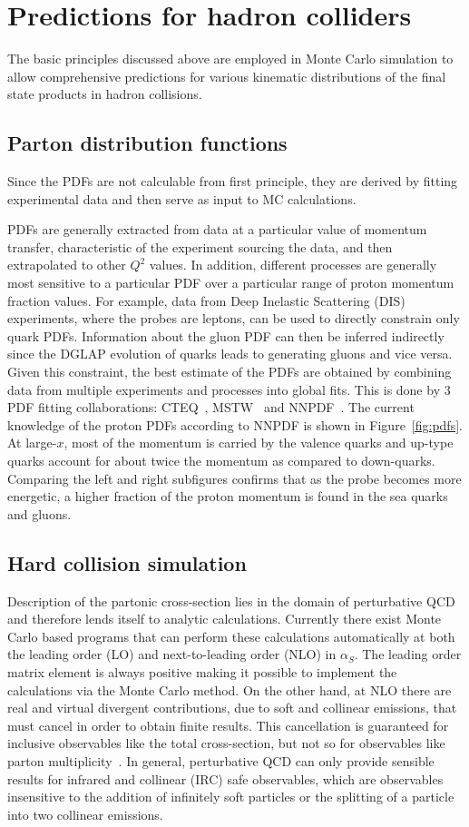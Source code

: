 \section{Predictions for hadron colliders}
The basic principles discussed above are employed in Monte Carlo simulation to allow comprehensive predictions for various kinematic distributions of the final state products in hadron collisions.
\subsection{Parton distribution functions}

Since the PDFs are not calculable from first principle, they are derived by fitting experimental data and then serve as input to MC calculations. 

PDFs are generally extracted from data at a particular value of momentum transfer, characteristic of the experiment sourcing the data, and then extrapolated to other $Q^2$ values. In addition, different processes are generally most sensitive to a particular PDF over a particular range of proton momentum fraction values. For example, data from Deep Inelastic Scattering (DIS) experiments, where the probes are leptons, can be used to directly constrain only quark PDFs. Information about the gluon PDF can then be inferred indirectly since the DGLAP evolution of quarks leads to generating gluons and vice versa.
Given this constraint, the best estimate of the PDFs are obtained by combining data from multiple experiments and processes into global fits. This is done by 3 PDF fitting collaborations: CTEQ~\cite{Lai:2010CT10}, MSTW~\cite{Martin:2009MSTW} and NNPDF~\cite{Ball:2012NNPDF}. The current knowledge of the proton PDFs according to NNPDF is shown in Figure~\ref{fig:pdfs}. At large-$x$, most of the momentum is carried by the valence quarks and up-type quarks account for about twice the momentum as compared to down-quarks. Comparing the left and right subfigures confirms that as the probe becomes more energetic, a higher fraction of the proton momentum is found in the sea quarks and gluons. 
\subsection{Hard collision simulation}
Description of the partonic cross-section lies in the domain of perturbative QCD and therefore lends itself to analytic calculations. Currently there exist Monte Carlo based programs that can perform these calculations automatically at both the leading order (LO) and next-to-leading order (NLO) in $\alpha_S$. The leading order matrix element is always positive making it possible to implement the calculations via the Monte Carlo method. On the other hand, at NLO there are real and virtual divergent contributions, due to soft and collinear emissions, that must cancel in order to obtain finite results. This cancellation is guaranteed for inclusive observables like the total cross-section, but not so for observables like parton multiplicity~\cite{pdgbook}. In general, perturbative QCD can only provide sensible results for infrared and collinear (IRC) safe observables, which are observables insensitive to the addition of infinitely soft particles or the splitting of a particle into two collinear emissions.

